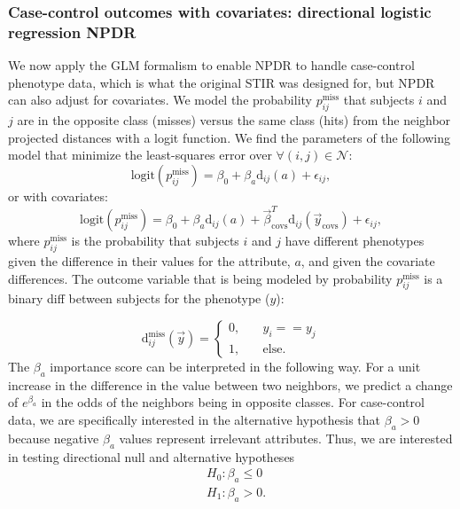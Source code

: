 \documentclass[10pt]{article}
\begin{document}
\subsubsection{Case-control outcomes with covariates: directional logistic regression NPDR}
We now apply the GLM formalism to enable NPDR to handle case-control phenotype data, which is what the original STIR was designed for, but NPDR can also adjust for covariates. We model the probability $p^{\text{miss}}_{ij}$ that subjects $i$ and $j$ are in the opposite class (misses) versus the same class (hits) from the neighbor projected distances with a logit function. We find the parameters of the following model that minimize the least-squares error over $\forall(i,j) \in \mathcal{N}$:   
\begin{equation}
\text{logit}(p^{\text{miss}}_{ij}) = \beta_0 + \beta_a \text{d}_{ij}(a) + \epsilon_{ij},   
\end{equation}
or with covariates:
\begin{equation}\label{eq:too_logit}
\text{logit}(p^{\text{miss}}_{ij}) = \beta_0 + \beta_a \text{d}_{ij}(a) + \vec{\beta}^{T}_{\text{covs}} \text{d}_{ij}(\vec{y}_{\text{covs}}) + \epsilon_{ij},   
\end{equation}
where $p^{\text{miss}}_{ij}$ is the probability that subjects $i$ and $j$ have different phenotypes given the difference in their values for the attribute, $a$, and given the covariate differences. The outcome variable that is being modeled by probability $p^{\text{miss}}_{ij}$ is a binary diff between subjects for the phenotype ($y$):
   
 \begin{equation}\label{eq:hitdiff}
 \text{d}^{\text{miss}}_{ij}(\vec{y}) = \left\{
        \begin{array}{ll}
            0, & \quad  y_{i} == y_{j} \\
            1, & \quad \text{else}.
        \end{array}
    \right.
    \end{equation}
The $\beta_a$ importance score can be interpreted in the following way. For a unit increase in the difference in the value between two neighbors, we predict a change of $e^{\beta_a}$ in the odds of the neighbors being in opposite classes. For case-control data, we are specifically interested in the alternative hypothesis that $\beta_a>0$ because negative $\beta_a$ values represent irrelevant attributes. Thus, we are interested in testing directional null and alternative hypotheses
\begin{equation}
\begin{aligned}
    & H_0: \beta_a \le 0 \\
    & H_1: \beta_a > 0.
\end{aligned}
\end{equation}
\end{document}
